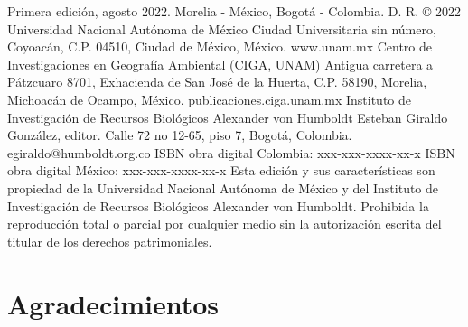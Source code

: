 \documentclass[
  12pt,
  letterpaper,
  twoside]{book}
\let\oldmaketitle\maketitle
\begin{document}
\begin{multicols*}{2}
{    \linebreak
    \newline Primera edición, agosto 2022. Morelia - México, Bogotá - Colombia.  
    D. R. © 2022 Universidad Nacional Autónoma de México 
    Ciudad Universitaria sin número, Coyoacán, C.P. 04510, Ciudad de México, México.
    www.unam.mx
    \newline Centro de Investigaciones en Geografía Ambiental (CIGA, UNAM) 
    Antigua carretera a Pátzcuaro 8701, Exhacienda de San José de la Huerta, C.P. 58190, Morelia, Michoacán de Ocampo, México.
    publicaciones.ciga.unam.mx
    \newline Instituto de Investigación de Recursos Biológicos Alexander von Humboldt
    Esteban Giraldo González, editor.
    Calle 72 no 12-65, piso 7, Bogotá, Colombia.
    egiraldo@humboldt.org.co 
    \newline ISBN obra digital Colombia: xxx-xxx-xxxx-xx-x \hspace*{\fill}
    \newline ISBN obra digital México: xxx-xxx-xxxx-xx-x \hspace*{\fill}
    \linebreak
    \newline Esta edición y sus características son propiedad de la Universidad Nacional Autónoma de México y del Instituto de Investigación de Recursos Biológicos Alexander von Humboldt. Prohibida la reproducción total o parcial por cualquier medio sin la autorización escrita del titular de los derechos patrimoniales.}
\end{multicols*}
\vspace*{\fill}

\let\maketitle\oldmaketitle
\maketitle

\renewcommand*\contentsname{Índice}
{
\hypersetup{linkcolor=black}
\setcounter{tocdepth}{1}
\tableofcontents
}
\setlength{\aweboxleftmargin}{0.1\linewidth}
\setlength{\aweboxcontentwidth}{0.85\linewidth}
\setlength{\aweboxvskip}{1mm}
\setlength{\aweboxrulewidth}{5pt}

\newpage

\hypertarget{agradecimientos}{%
\chapter*{Agradecimientos}\label{agradecimientos}}
\end{document}
